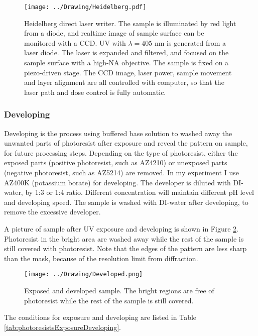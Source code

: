 \documentclass[pdftex, sectionletters]{pittetd}    %
\begin{document}
\begin{figure}[hp]
	\centering
	\texttt{[image: ../Drawing/Heidelberg.pdf]}
	\caption{Heidelberg direct laser writer. The sample is illuminated by red light from a diode, and realtime image of sample surface can be monitored with a CCD. UV with $\lambda=405$ nm is generated from a laser diode. The laser is expanded and filtered, and focused on the sample surface with a high-NA objective. The sample is fixed on a piezo-driven stage. The CCD image, laser power, sample movement and layer alignment are all controlled with computer, so that the laser path and dose control is fully automatic.}
	\label{FIG:Heidelberg}
\end{figure}

\subsubsection{Developing}

Developing is the process using buffered base solution to washed away the unwanted parts of photoresist after exposure and reveal the pattern on sample, for future processing steps. Depending on the type of photoresist, either the exposed parts (positive photoresist, such as AZ4210) or unexposed parts (negative photoresist, such as AZ5214) are removed. In my experiment I use AZ400K (potassium borate) for developing. The developer is diluted with DI-water, by 1:3 or 1:4 ratio. Different concentration will maintain different pH level and developing speed. The sample is washed with DI-water after developing, to remove the excessive developer. 

A picture of sample after UV exposure and developing is shown in Figure \ref{FIG:Developed}. Photoresist in the bright area are washed away while the rest of the sample is still covered with photoresist. Note that the edges of the pattern are less sharp than the mask, because of the resolution limit from diffraction. 

\begin{figure}[h!]
	\centering
	\texttt{[image: ../Drawing/Developed.png]}
	\caption{Exposed and developed sample. The bright regions are free of photoresist while the rest of the sample is still covered.}
	\label{FIG:Developed}
\end{figure}

The conditions for exposure and developing are listed in Table \ref{tab:photoresistsExposureDeveloping}.
\end{document}
